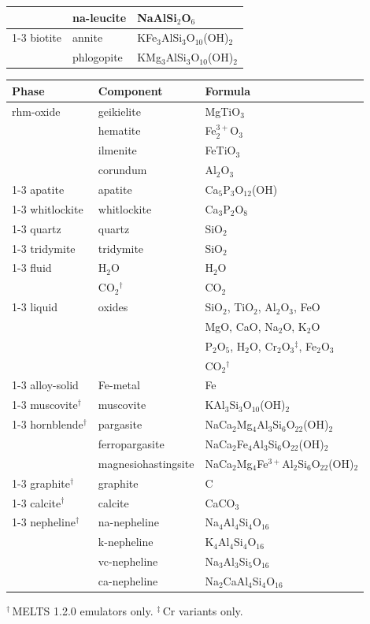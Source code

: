 \begin{landscape}
\begin{table}[p]
\begin{tabular}[t]{@{}l l l@{}}
 & na-leucite & NaAlSi$_{2}$O$_{6}$ \\
\cmidrule{1-3}
biotite & annite & KFe$_{3}$AlSi$_{3}$O$_{10}$(OH)$_{2}$ \\
 & phlogopite & KMg$_{3}$AlSi$_{3}$O$_{10}$(OH)$_{2}$ \\
\bottomrule
\end{tabular}
\hfill
\begin{tabular}[t]{@{}l l l@{}}
\toprule
Phase & Component & Formula \\
\midrule
rhm-oxide & geikielite & MgTiO$_{3}$ \\
 & hematite & Fe$^{3+}_{2}$O$_{3}$ \\
 & ilmenite & FeTiO$_{3}$ \\
 & corundum & Al$_{2}$O$_{3}$ \\
\cmidrule{1-3}
apatite & apatite & Ca$_{5}$P$_{3}$O$_{12}$(OH) \\
\cmidrule{1-3}
whitlockite & whitlockite & Ca$_{3}$P$_{2}$O$_{8}$ \\
\cmidrule{1-3}
quartz & quartz & SiO$_{2}$ \\
\cmidrule{1-3}
tridymite & tridymite & SiO$_{2}$ \\
\cmidrule{1-3}
fluid & H$_{2}$O & H$_2$O \\
 & CO$_{2}$$^{\dagger}$ & CO$_{2}$ \\
\cmidrule{1-3}
liquid & oxides & SiO$_{2}$, TiO$_{2}$, Al$_{2}$O$_{3}$, FeO \\
 &  & MgO, CaO, Na$_{2}$O, K$_{2}$O \\
 &  & P$_{2}$O$_{5}$, H$_{2}$O, Cr$_{2}$O$_{3}$$^{\ddagger}$, Fe$_{2}$O$_{3}$ \\
 &  & CO$_{2}$$^{\dagger}$ \\
\cmidrule{1-3}
alloy-solid & Fe-metal & Fe \\
\cmidrule{1-3}
muscovite$^{\dagger}$ & muscovite & KAl$_{3}$Si$_{3}$O$_{10}$(OH)$_{2}$ \\
\cmidrule{1-3}
hornblende$^{\dagger}$ & pargasite & NaCa$_{2}$Mg$_{4}$Al$_{3}$Si$_{6}$O$_{22}$(OH)$_{2}$ \\
 & ferropargasite & NaCa$_{2}$Fe$_{4}$Al$_{3}$Si$_{6}$O$_{22}$(OH)$_{2}$ \\
 & magnesiohastingsite & NaCa$_{2}$Mg$_{4}$Fe$^{3+}$Al$_{2}$Si$_{6}$O$_{22}$(OH)$_{2}$ \\
\cmidrule{1-3}
graphite$^{\dagger}$ & graphite & C \\
\cmidrule{1-3}
calcite$^{\dagger}$ & calcite & CaCO$_{3}$ \\
\cmidrule{1-3}
nepheline$^{\dagger}$ & na-nepheline & Na$_{4}$Al$_{4}$Si$_{4}$O$_{16}$ \\
 & k-nepheline & K$_{4}$Al$_{4}$Si$_{4}$O$_{16}$ \\
 & vc-nepheline & Na$_{3}$Al$_{3}$Si$_{5}$O$_{16}$ \\
 & ca-nepheline & Na$_{2}$CaAl$_{4}$Si$_{4}$O$_{16}$ \\
\bottomrule
\end{tabular}
\par\medskip
\noindent $^{\dagger}$\,\textsc{MELTS} 1.2.0 emulators only. $^{\ddagger}$\,Cr variants only.
\end{table}
\end{landscape}
